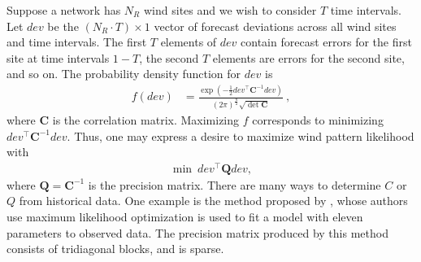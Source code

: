 \documentclass[conference]{IEEEtran}
\begin{document}
Suppose a network has $N_R$ wind sites and we wish to consider $T$ time intervals. Let $dev$ be the $(N_R\cdot T)\times 1$ vector of forecast deviations across all wind sites and time intervals. The first $T$ elements of $dev$ contain forecast errors for the first site at time intervals $1-T$, the second $T$ elements are errors for the second site, and so on. The probability density function for $dev$ is
\begin{align*}
f(dev) &= \frac{\exp \left(-\frac{1}{2} dev^\top \mathbf{C}^{-1} dev \right)}{(2\pi)^{\frac{n}{2}}\sqrt{\det \mathbf{C}}}~,
\end{align*}
where $\mathbf{C}$ is the correlation matrix. Maximizing $f$ corresponds to minimizing $dev^\top \mathbf{C}^{-1} dev$. Thus, one may express a desire to maximize wind pattern likelihood with
\begin{align*}
\min~ dev^\top \mathbf{Q} dev,
\end{align*}
where $\mathbf{Q}=\mathbf{C}^{-1}$ is the precision matrix. There are many ways to determine $C$ or $Q$ from historical data. One example is the method proposed by \cite{tastu2015}, whose authors use maximum likelihood optimization is used to fit a model with eleven parameters to observed data. The precision matrix produced by this method consists of tridiagonal blocks, and is sparse.




\end{document}
